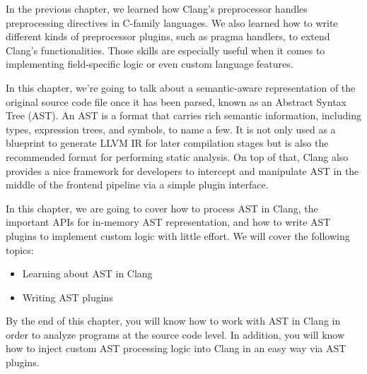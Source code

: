 In the previous chapter, we learned how Clang's preprocessor handles preprocessing directives in C-family languages. We also learned how to write different kinds of preprocessor plugins, such as pragma handlers, to extend Clang's functionalities. Those skills are especially useful when it comes to implementing field-specific logic or even custom language features.

In this chapter, we're going to talk about a semantic-aware representation of the original source code file once it has been parsed, known as an Abstract Syntax Tree (AST). An AST is a format that carries rich semantic information, including types, expression trees, and symbols, to name a few. It is not only used as a blueprint to generate LLVM IR for later compilation stages but is also the recommended format for performing static analysis. On top of that, Clang also provides a nice framework for developers to intercept and manipulate AST in the middle of the frontend pipeline via a simple plugin interface.

In this chapter, we are going to cover how to process AST in Clang, the important APIs for in-memory AST representation, and how to write AST plugins to implement custom logic with little effort. We will cover the following topics:

\begin{itemize}
\item Learning about AST in Clang
\item Writing AST plugins
\end{itemize}

By the end of this chapter, you will know how to work with AST in Clang in order to analyze programs at the source code level. In addition, you will know how to inject custom AST processing logic into Clang in an easy way via AST plugins.






































